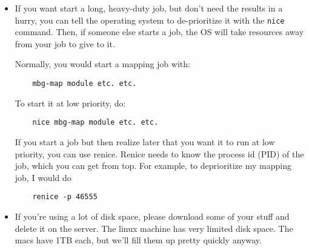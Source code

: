 {\begin{itemize}
    Notice process number 46555, which is a mapping job. It's using 586.4\% of the CPU right now. That means it's using about six of this machine's eight cores. 

    If you start another mapping job on my machine, the two will compete for resources, meaning they'll both slow down. This slowdown is usually nonlinear. Like humans, processor cores are more efficient when they can concentrate on a single task rather than switching contexts all the time.

    On the other hand, if you start a small job, such as an MCMC with n less than 100, my mapping job probably won't notice the difference, because my computer has spare capacity.

    Top can also show only the processes owned by particular users, for example:

    \begin{verbatim}
    top -U anand
    top -U noor
    top -U ibd    
    \end{verbatim}


    \item If you want start a long, heavy-duty job, but don't need the results in a hurry, you can tell the operating system to de-prioritize it with the \texttt{nice} command. Then, if someone else starts a job, the OS will take resources away from your job to give to it.

    Normally, you would start a mapping job with:

    \begin{verbatim}
    mbg-map module etc. etc.    
    \end{verbatim}

    To start it at low priority, do:

    \begin{verbatim}
    nice mbg-map module etc. etc.    
    \end{verbatim}


    If you start a job but then realize later that you want it to run at low priority, you can use renice. Renice needs to know the process id (PID) of the job, which you can get from top. For example, to deprioritize my mapping job, I would do

    \begin{verbatim}
    renice -p 46555    
    \end{verbatim}



    \item If you're using a lot of disk space, please download some of your stuff and delete it on the server. The linux machine has very limited disk space. The macs have 1TB each, but we'll fill them up pretty quickly anyway.


\end{itemize}}
